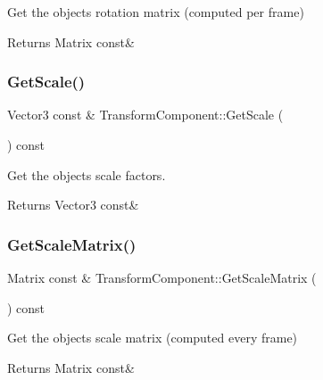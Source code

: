 Get the object\textquotesingle{}s rotation matrix (computed per frame) 

\begin{DoxyReturn}{Returns}
Matrix const\& 
\end{DoxyReturn}
\mbox{\label{classTransformComponent_af9a3c385a334fadeac09a18149e89d05}} 
\subsubsection{\texorpdfstring{Get\+Scale()}{GetScale()}}
{\footnotesize\ttfamily Vector3 const  \& Transform\+Component\+::\+Get\+Scale (\begin{DoxyParamCaption}{ }\end{DoxyParamCaption}) const}



Get the object\textquotesingle{}s scale factors. 

\begin{DoxyReturn}{Returns}
Vector3 const\& 
\end{DoxyReturn}
\mbox{\label{classTransformComponent_af55f4a1e6167f8a260e581850848299d}} 
\subsubsection{\texorpdfstring{Get\+Scale\+Matrix()}{GetScaleMatrix()}}
{\footnotesize\ttfamily Matrix const  \& Transform\+Component\+::\+Get\+Scale\+Matrix (\begin{DoxyParamCaption}{ }\end{DoxyParamCaption}) const}



Get the object\textquotesingle{}s scale matrix (computed every frame) 

\begin{DoxyReturn}{Returns}
Matrix const\& 
\end{DoxyReturn}
\mbox{\label{classTransformComponent_a305b12762fc44d18713ebe31664c92f2}} 
